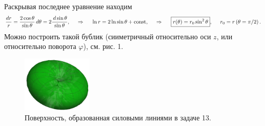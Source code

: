 Раскрывая последнее уравнение находим
\begin{equation*}
    \frac{d r}{r} = \frac{2 \cos \theta}{\sin \theta}\, d \theta = 2 \frac{\, d \sin \theta}{\sin \theta},
    \hspace{0.5cm} \Rightarrow \hspace{0.5cm}
    \ln r = 2 \ln \sin \theta + \text{const},
    \hspace{0.5cm} \Rightarrow \hspace{0.5cm}
    \boxed{
    r(\theta) = r_0 \sin^2 \theta
    }
    , \hspace{5 mm} r_0 = r\left(\theta=\pi/2\right).
\end{equation*}
Можно построить такой бублик (сииметричный относительно оси $z$, или относительно поворота $\varphi$), см. рис. 1.
\begin{figure}[h]
    \centering
    \includegraphics[width=0.3\textwidth]{figures/t13.png}
    \caption{Поверхность, образованная силовыми линиями в задаче 13.}
\end{figure}


